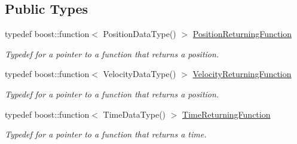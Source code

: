 \subsection*{Public Types}
\begin{DoxyCompactItemize}
\item 
typedef boost\+::function$<$ Position\+Data\+Type() $>$ \hyperlink{classtudat_1_1unit__tests_1_1AnotherDerivedAccelerationModel_afc6c0f446142eb265d5306b9d50e82d6}{Position\+Returning\+Function}\hypertarget{classtudat_1_1unit__tests_1_1AnotherDerivedAccelerationModel_afc6c0f446142eb265d5306b9d50e82d6}{}\label{classtudat_1_1unit__tests_1_1AnotherDerivedAccelerationModel_afc6c0f446142eb265d5306b9d50e82d6}

\begin{DoxyCompactList}\small\item\em Typedef for a pointer to a function that returns a position. \end{DoxyCompactList}\item 
typedef boost\+::function$<$ Velocity\+Data\+Type() $>$ \hyperlink{classtudat_1_1unit__tests_1_1AnotherDerivedAccelerationModel_a34ee57f48cdcac94bdf12e282de14756}{Velocity\+Returning\+Function}\hypertarget{classtudat_1_1unit__tests_1_1AnotherDerivedAccelerationModel_a34ee57f48cdcac94bdf12e282de14756}{}\label{classtudat_1_1unit__tests_1_1AnotherDerivedAccelerationModel_a34ee57f48cdcac94bdf12e282de14756}

\begin{DoxyCompactList}\small\item\em Typedef for a pointer to a function that returns a position. \end{DoxyCompactList}\item 
typedef boost\+::function$<$ Time\+Data\+Type() $>$ \hyperlink{classtudat_1_1unit__tests_1_1AnotherDerivedAccelerationModel_a69b5e6c22cec492702d5d25fc6db8dfb}{Time\+Returning\+Function}\hypertarget{classtudat_1_1unit__tests_1_1AnotherDerivedAccelerationModel_a69b5e6c22cec492702d5d25fc6db8dfb}{}\label{classtudat_1_1unit__tests_1_1AnotherDerivedAccelerationModel_a69b5e6c22cec492702d5d25fc6db8dfb}

\begin{DoxyCompactList}\small\item\em Typedef for a pointer to a function that returns a time. \end{DoxyCompactList}\end{DoxyCompactItemize}
